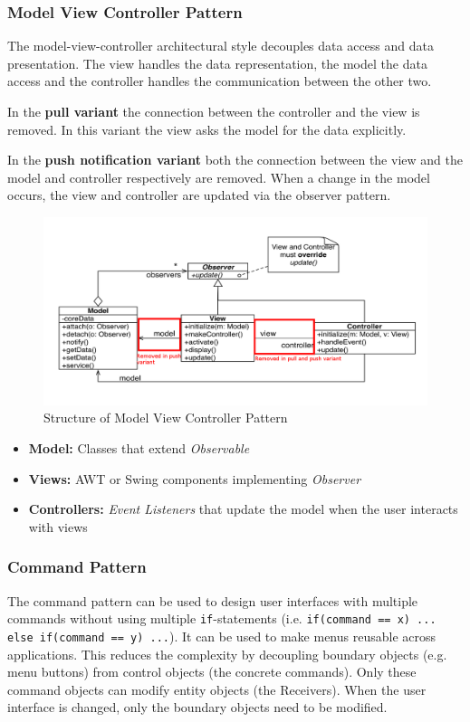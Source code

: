\subsubsection{Model View Controller Pattern}
The model-view-controller architectural style decouples data access and data presentation.
The view handles the data representation, the model the data access and the controller handles the communication between the other two.\newline

In the \textbf{pull variant} the connection between the controller and the view is removed.
In this variant the view asks the model for the data explicitly.

In the \textbf{push notification variant} both the connection between the view and the model and controller respectively are removed.
When a change in the model occurs, the view and controller are updated via the observer pattern.

\begin{figure}[h]
	\centering
	\includegraphics[width=\linewidth]{images/pattern_mvc.png}
	\caption{Structure of Model View Controller Pattern}
\end{figure}

\begin{itemize}
  \item \textbf{Model:} Classes that extend \textit{Observable}
  \item \textbf{Views:} AWT or Swing components implementing \textit{Observer}
  \item \textbf{Controllers:} \textit{Event Listeners} that update the model when the user interacts with views
\end{itemize}

\newpage

\subsubsection{Command Pattern}
The command pattern can be used to design user interfaces with multiple commands without using multiple \texttt{if}-statements (i.e. \texttt{if(command == x) {...} else if(command == y) ...}).
It can be used to make menus reusable across applications.
This reduces the complexity by decoupling boundary objects (e.g. menu buttons) from control objects (the concrete commands). Only these command objects can modify entity objects (the
Receivers).
When the user interface is changed, only the boundary objects need to be modified.\newline

